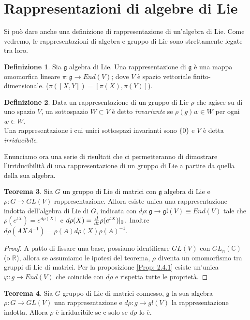 \documentclass[12pt,a4paper]{report}
\theoremstyle{definition}
\newtheorem{Def}{Definizione}[chapter]
\theoremstyle{Theorem}
\newtheorem{Theo}[Def]{Teorema}
\theoremstyle{definition}
\theoremstyle{definition}
\theoremstyle{definition}
\begin{document}
\section{Rappresentazioni di algebre di Lie}
Si può dare anche una definizione di rappresentazione di un'algebra di Lie. Come vedremo, le rappresentazioni di algebra e gruppo di Lie sono strettamente legate tra loro.
\begin{Def}
	Sia $\mathfrak{g}$ algebra di Lie. Una rappresentazione di $\mathfrak{g}$ è una mappa omomorfica lineare $\pi:\mathfrak{g}\rightarrow End(V)$; dove $V$ è spazio vettoriale finito-dimensionale. ($\pi([X,Y])=[\pi(X),\pi(Y)]$).
\end{Def}
\begin{Def}
	Data un rappresentazione di un gruppo di Lie $\rho$ che agisce su di uno spazio $V$, un sottospazio $W\subset V$ è detto \textit{invariante} se $\rho(g)w\in W$ per ogni $w\in W$.\\
	Una rappresentazione i cui unici sottospazi invarianti sono $\{0\}$ e $V$ è detta \textit{irriducibile}.
\end{Def}
Enunciamo ora una serie di risultati che ci permetteranno di dimostrare l'irriducibilità di una rappresentazione di un gruppo di Lie a partire da quella della sua algebra.
\begin{Theo}
	Sia $G$ un gruppo di Lie di matrici con $\mathfrak{g}$ algebra di Lie e $\rho:G\rightarrow GL(V)$ rappresentazione. Allora esiste unica una rappresentazione indotta dell'algebra di Lie di $G$, indicata con $d\rho:\mathfrak{g}\rightarrow \mathfrak{gl}(V)\equiv End(V)$ tale che $\rho(e^{tX})=e^{d\rho(X)}$ e $d\rho(X)={d\over dt}\rho(e^{tX})|_0$.\
	Inoltre $d\rho(AXA^{-1})=\rho(A)d\rho(X)\rho(A)^{-1}$.	
\end{Theo}
\begin{proof}
	A patto di fissare una base, possiamo identificare $GL(V)$ con $GL_n(\mathbb{C})$ (o $\mathbb{R}$), allora se assumiamo le ipotesi del teorema, $\rho$ diventa un omomorfismo tra gruppi di Lie di matrici. Per la proposizione \ref{Prop: 2.4.1} esiste un'unica $\varphi:g\rightarrow End(V)$ che coincide con $d\rho$ e rispetta tutte le proprietà.
\end{proof}
\begin{Theo}\label{Theo: 3.1}
	Sia $G$ gruppo di Lie di matrici connesso, $\mathfrak{g}$ la sua algebra $\rho:G\rightarrow GL(V)$ una rappresentazione e $d\rho:g\rightarrow gl(V)$ la rappresentazione indotta. Allora $\rho$ è irriducibile se e solo se $d\rho$ lo è.
\end{Theo}
\end{document}
